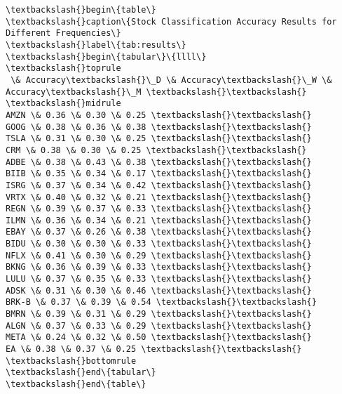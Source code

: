 \documentclass[11pt]{article}
\begin{document}
    \begin{Verbatim}[commandchars=\\\{\}]
\textbackslash{}begin\{table\}
\textbackslash{}caption\{Stock Classification Accuracy Results for Different Frequencies\}
\textbackslash{}label\{tab:results\}
\textbackslash{}begin\{tabular\}\{llll\}
\textbackslash{}toprule
 \& Accuracy\textbackslash{}\_D \& Accuracy\textbackslash{}\_W \& Accuracy\textbackslash{}\_M \textbackslash{}\textbackslash{}
\textbackslash{}midrule
AMZN \& 0.36 \& 0.30 \& 0.25 \textbackslash{}\textbackslash{}
GOOG \& 0.38 \& 0.36 \& 0.38 \textbackslash{}\textbackslash{}
TSLA \& 0.31 \& 0.30 \& 0.25 \textbackslash{}\textbackslash{}
CRM \& 0.38 \& 0.30 \& 0.25 \textbackslash{}\textbackslash{}
ADBE \& 0.38 \& 0.43 \& 0.38 \textbackslash{}\textbackslash{}
BIIB \& 0.35 \& 0.34 \& 0.17 \textbackslash{}\textbackslash{}
ISRG \& 0.37 \& 0.34 \& 0.42 \textbackslash{}\textbackslash{}
VRTX \& 0.40 \& 0.32 \& 0.21 \textbackslash{}\textbackslash{}
REGN \& 0.39 \& 0.37 \& 0.33 \textbackslash{}\textbackslash{}
ILMN \& 0.36 \& 0.34 \& 0.21 \textbackslash{}\textbackslash{}
EBAY \& 0.37 \& 0.26 \& 0.38 \textbackslash{}\textbackslash{}
BIDU \& 0.30 \& 0.30 \& 0.33 \textbackslash{}\textbackslash{}
NFLX \& 0.41 \& 0.30 \& 0.29 \textbackslash{}\textbackslash{}
BKNG \& 0.36 \& 0.39 \& 0.33 \textbackslash{}\textbackslash{}
LULU \& 0.37 \& 0.35 \& 0.33 \textbackslash{}\textbackslash{}
ADSK \& 0.31 \& 0.30 \& 0.46 \textbackslash{}\textbackslash{}
BRK-B \& 0.37 \& 0.39 \& 0.54 \textbackslash{}\textbackslash{}
BMRN \& 0.39 \& 0.31 \& 0.29 \textbackslash{}\textbackslash{}
ALGN \& 0.37 \& 0.33 \& 0.29 \textbackslash{}\textbackslash{}
META \& 0.24 \& 0.32 \& 0.50 \textbackslash{}\textbackslash{}
EA \& 0.38 \& 0.37 \& 0.25 \textbackslash{}\textbackslash{}
\textbackslash{}bottomrule
\textbackslash{}end\{tabular\}
\textbackslash{}end\{table\}

    \end{Verbatim}
\end{document}
